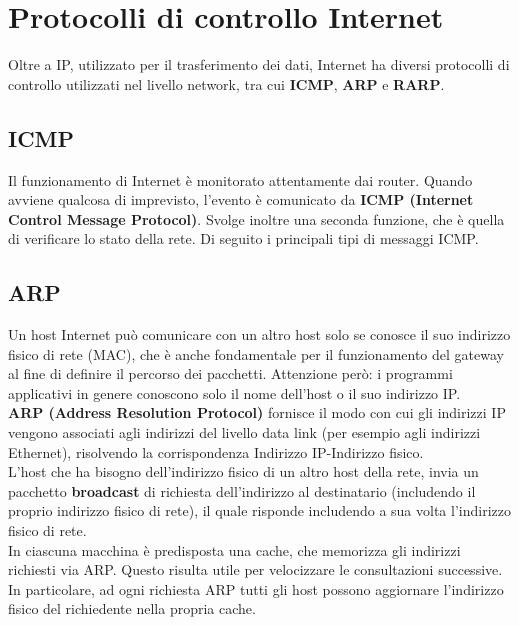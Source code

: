 \section{Protocolli di controllo Internet}
    Oltre a IP, utilizzato per il trasferimento dei dati, Internet ha diversi protocolli di controllo
    utilizzati nel livello network, tra cui \textbf{ICMP}, \textbf{ARP} e \textbf{RARP}.

    \subsection{ICMP}
        Il funzionamento di Internet è monitorato attentamente dai router. Quando avviene qualcosa
        di imprevisto, l’evento è comunicato da \textbf{ICMP (Internet Control Message Protocol)}. Svolge
        inoltre una seconda funzione, che è quella di verificare lo stato della rete. Di seguito i principali
        tipi di messaggi ICMP.


    \subsection{ARP}
        Un host Internet può comunicare con un altro host solo se conosce il suo indirizzo fisico di rete
        (MAC), che è anche fondamentale per il funzionamento del gateway al fine di definire il
        percorso dei pacchetti. Attenzione però: i programmi applicativi in genere conoscono solo il
        nome dell’host o il suo indirizzo IP.\\
        
        \textbf{ARP (Address Resolution Protocol)} fornisce il modo con cui gli indirizzi IP vengono associati
        agli indirizzi del livello data link (per esempio agli indirizzi Ethernet), risolvendo la
        corrispondenza Indirizzo IP-Indirizzo fisico.\\

        L’host che ha bisogno dell’indirizzo fisico di un altro host della rete, invia un pacchetto
        \textbf{broadcast} di richiesta dell’indirizzo al destinatario (includendo il proprio indirizzo fisico di
        rete), il quale risponde includendo a sua volta l’indirizzo fisico di rete.\\

        In ciascuna macchina è predisposta una cache, che memorizza gli indirizzi richiesti via ARP.
        Questo risulta utile per velocizzare le consultazioni successive. In particolare, ad ogni richiesta
        ARP tutti gli host possono aggiornare l’indirizzo fisico del richiedente nella propria cache.
        

